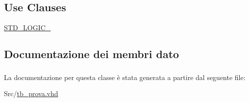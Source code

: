 \subsection*{Use Clauses}
 \begin{DoxyCompactItemize}
\item 
\hyperlink{classtb__prova_aa4b2b25246a821511120e3149b003563}{S\+T\+D\+\_\+\+L\+O\+G\+I\+C\+\_}   
\end{DoxyCompactItemize}


\subsection{Documentazione dei membri dato}
\hypertarget{classtb__prova_ae4f03c286607f3181e16b9aa12d0c6d4}{
\subsubsection[{I\+E\+E\+E}]{\hspace{0.3cm}{\ttfamily [Library]}}}\label{classtb__prova_ae4f03c286607f3181e16b9aa12d0c6d4}
\hypertarget{classtb__prova_aa4b2b25246a821511120e3149b003563}{
\subsubsection[{S\+T\+D\+\_\+\+L\+O\+G\+I\+C\+\_\+1164}]{\hspace{0.3cm}{\ttfamily [Package]}}}\label{classtb__prova_aa4b2b25246a821511120e3149b003563}


La documentazione per questa classe è stata generata a partire dal seguente file\+:\begin{DoxyCompactItemize}
\item 
Src/\hyperlink{tb__prova_8vhd}{tb\+\_\+prova.\+vhd}\end{DoxyCompactItemize}
